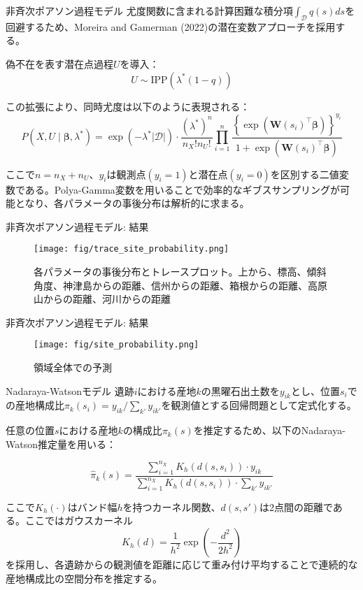 \documentclass[xelatex, 8pt]{beamer}
\theoremstyle{plain}
\theoremstyle{definition}
\begin{document}
\begin{frame}{非斉次ポアソン過程モデル}
    尤度関数に含まれる計算困難な積分項$\int_{\mathcal{D}} q(s) ds$を回避するため、Moreira and Gamerman (2022)\cite{Moreira2022}の潜在変数アプローチを採用する。

    偽不在を表す潜在点過程$U$を導入：
    $$U \sim \text{IPP}(\lambda^*(1-q))$$

    この拡張により、同時尤度は以下のように表現される：
    $$P(X, U \mid \boldsymbol{\beta}, \lambda^*) = \exp \left( - \lambda^* |\mathcal{D}| \right) \cdot \frac{(\lambda^*)^{n}}{n_X!n_U!} \prod_{i=1}^{n} \frac{\left\{\exp\left( \boldsymbol{W}(s_i)^\top \boldsymbol{\beta} \right)\right\}^{y_i}}{1 + \exp\left(\boldsymbol{W}(s_i)^\top \boldsymbol{\beta}\right)}$$

    ここで$n = n_X + n_U$、$y_i$は観測点$(y_i=1)$と潜在点$(y_i=0)$を区別する二値変数である。Polya-Gamma変数を用いることで効率的なギブスサンプリングが可能となり、各パラメータの事後分布は解析的に求まる。
\end{frame}

\begin{frame}{非斉次ポアソン過程モデル: 結果}
    \begin{figure}\centering\texttt{[image: fig/trace\_site\_probability.png]}\caption{各パラメータの事後分布とトレースプロット。上から、標高、傾斜角度、神津島からの距離、信州からの距離、箱根からの距離、高原山からの距離、河川からの距離}
    \end{figure}
\end{frame}

\begin{frame}{非斉次ポアソン過程モデル: 結果}
    \begin{figure}\centering\texttt{[image: fig/site\_probability.png]}\caption{領域全体での予測}
    \end{figure}
\end{frame}

\begin{frame}{Nadaraya-Watsonモデル}
    遺跡$i$における産地$k$の黒曜石出土数を$y_{ik}$とし、位置$s_i$での産地構成比$\pi_k(s_i) = y_{ik}/\sum_{k'}y_{ik'}$を観測値とする回帰問題として定式化する。

    任意の位置$s$における産地$k$の構成比$\pi_k(s)$を推定するため、以下のNadaraya-Watson推定量を用いる：

    $$\hat{\pi}_k(s) = \frac{\sum_{i=1}^{n_X} K_h(d(s,s_i)) \cdot y_{ik}}{\sum_{i=1}^{n_X} K_h(d(s,s_i)) \cdot \sum_{k'} y_{ik'}}$$

    ここで$K_h(\cdot)$はバンド幅$h$を持つカーネル関数、$d(s,s')$は2点間の距離である。ここではガウスカーネル
    $$K_h(d) = \frac{1}{h^2} \exp \left(-\frac{d^2}{2h^2}\right)$$
    を採用し、各遺跡からの観測値を距離に応じて重み付け平均することで連続的な産地構成比の空間分布を推定する。
\end{frame}
\end{document}
